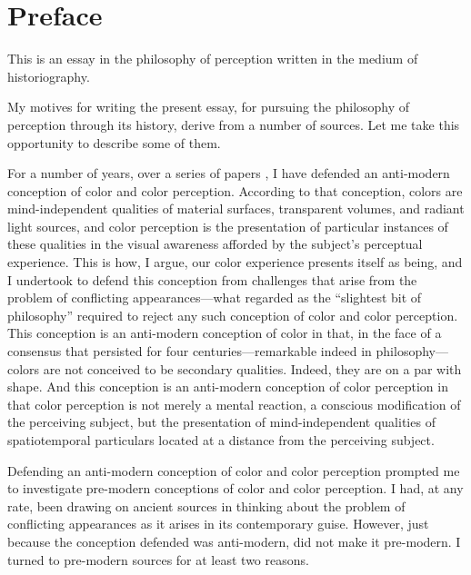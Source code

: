 \chapter*{Preface} %
\label{cha:preface}


This is an essay in the philosophy of perception written in the medium of historiography. 

My motives for writing the present essay, for pursuing the philosophy of perception through its history, derive from a number of sources. Let me take this opportunity to describe some of them.

For a number of years, over a series of papers \citep{Kalderon:2006tg,Kalderon:2008fk,Kalderon:2010fj,Kalderon:2007mr,Kalderon:2011fk}, I have defended an anti-modern conception of color and color perception. According to that conception, colors are mind-independent qualities of material surfaces, transparent volumes, and radiant light sources, and color perception is the presentation of particular instances of these qualities in the visual awareness afforded by the subject's perceptual experience. This is how, I argue, our color experience presents itself as being, and I undertook to defend this conception from challenges that arise from the problem of conflicting appearances---what \citet{Hume:1748zr} regarded as the ``slightest bit of philosophy'' required to reject any such conception of color and color perception. This conception is an anti-modern conception of color in that, in the face of a consensus that persisted for four centuries---remarkable indeed in philosophy---colors are not conceived to be secondary qualities. Indeed, they are on a par with shape. And this conception is an anti-modern conception of color perception in that color perception is not merely a mental reaction, a conscious modification of the perceiving subject, but the presentation of mind-independent qualities of spatiotemporal particulars located at a distance from the perceiving subject. 

Defending an anti-modern conception of color and color perception prompted me to investigate pre-modern conceptions of color and color perception. I had, at any rate, been drawing on ancient sources in thinking about the problem of conflicting appearances as it arises in its contemporary guise. However, just because the conception defended was anti-modern, did not make it pre-modern. I turned to pre-modern sources for at least two reasons. 

